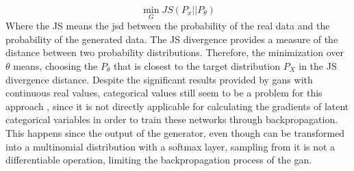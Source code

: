\begin{equation}
\min_{G} JS(P_{x}||P_{\theta})
\end{equation}
Where the JS means the \acl{jsd} between the probability of the real
data and the probability of the generated data. The JS divergence provides a measure
of the distance between two probability distributions. Therefore, the minimization over $\theta$
means, choosing the $P_{\theta}$ that is closest to the target distribution $P_{X}$ in the JS divergence
distance. Despite the significant results provided by \acp{gan} with continuous real values, categorical values still seem to be a problem for this approach \cite{kusner_gans_2016}, since it is not directly applicable for calculating the gradients of latent
categorical variables in order to train these networks through backpropagation. This
happens since the output of the generator, even though can be transformed into a multinomial distribution with a softmax layer, sampling from it is not a differentiable operation, limiting the backpropagation process of the \ac{gan}.


